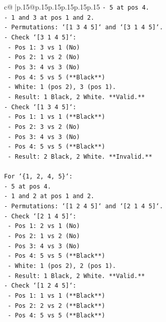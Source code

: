 \documentclass{article}
\begin{document}
{\begin{supertabular}{c@{$\;$}|p{.15\linewidth}@{}p{.15\linewidth}p{.15\linewidth}p{.15\linewidth}p{.15\linewidth}p{.15\linewidth}}
{{{\texttt{{-} 5 at pos 4.} \\
\texttt{{-} 1 and 3 at pos 1 and 2.} \\
\texttt{{-} Permutations: `{[}1 3 4 5{]}` and `{[}3 1 4 5{]}`.} \\
\texttt{{-} Check `{[}3 1 4 5{]}`:} \\
\texttt{  {-} Pos 1: 3 vs 1 (No)} \\
\texttt{  {-} Pos 2: 1 vs 2 (No)} \\
\texttt{  {-} Pos 3: 4 vs 3 (No)} \\
\texttt{  {-} Pos 4: 5 vs 5 (**Black**)} \\
\texttt{  {-} White: 1 (pos 2), 3 (pos 1).} \\
\texttt{  {-} Result: 1 Black, 2 White. **Valid.**} \\
\texttt{{-} Check `{[}1 3 4 5{]}`:} \\
\texttt{  {-} Pos 1: 1 vs 1 (**Black**)} \\
\texttt{  {-} Pos 2: 3 vs 2 (No)} \\
\texttt{  {-} Pos 3: 4 vs 3 (No)} \\
\texttt{  {-} Pos 4: 5 vs 5 (**Black**)} \\
\texttt{  {-} Result: 2 Black, 2 White. **Invalid.**} \\
\\ 
\texttt{For `\{1, 2, 4, 5\}`:} \\
\texttt{{-} 5 at pos 4.} \\
\texttt{{-} 1 and 2 at pos 1 and 2.} \\
\texttt{{-} Permutations: `{[}1 2 4 5{]}` and `{[}2 1 4 5{]}`.} \\
\texttt{{-} Check `{[}2 1 4 5{]}`:} \\
\texttt{  {-} Pos 1: 2 vs 1 (No)} \\
\texttt{  {-} Pos 2: 1 vs 2 (No)} \\
\texttt{  {-} Pos 3: 4 vs 3 (No)} \\
\texttt{  {-} Pos 4: 5 vs 5 (**Black**)} \\
\texttt{  {-} White: 1 (pos 2), 2 (pos 1).} \\
\texttt{  {-} Result: 1 Black, 2 White. **Valid.**} \\
\texttt{{-} Check `{[}1 2 4 5{]}`:} \\
\texttt{  {-} Pos 1: 1 vs 1 (**Black**)} \\
\texttt{  {-} Pos 2: 2 vs 2 (**Black**)} \\
\texttt{  {-} Pos 4: 5 vs 5 (**Black**)} \\
}}}
\end{supertabular}}
\end{document}
